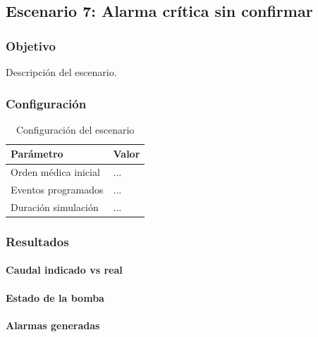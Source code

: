 \subsection{Escenario 7: Alarma crítica sin confirmar}

\subsubsection{Objetivo}

Descripción del escenario.

\subsubsection{Configuración}

\begin{table}[H]
\centering
\begin{tabular}{ll}
\toprule
Parámetro & Valor \\
\midrule
Orden médica inicial & ... \\
Eventos programados & ... \\
Duración simulación & ... \\
\bottomrule
\end{tabular}
\caption{Configuración del escenario}
\end{table}

\subsubsection{Resultados}

\paragraph{Caudal indicado vs real}


\paragraph{Estado de la bomba}


\paragraph{Alarmas generadas}

